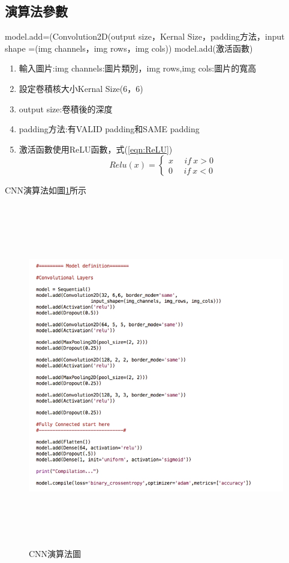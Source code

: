 \subsection{演算法參數}
model.add=(Convolution2D(output size，Kernal Size，padding方法，input shape =(img channels，img rows，img cols))
model.add(激活函數)
\begin{enumerate}
	\item
	      輸入圖片:img channels:圖片類別，img rows,img cols:圖片的寬高
	\item
	      設定卷積核大小Kernal Size(6，6)
	\item
	      output size:卷積後的深度
	\item
	      padding方法:有VALID padding和SAME padding
	\item
	      激活函數使用ReLU函數，式(\ref{eqn:ReLU})
	      \begin{equation}
		      \label{eqn:ReLU}
		      Relu(x)=
		      \left\{\begin{matrix}
			      x \ \ \ \ \ \ if\ x>0
			      \\
			      0 \ \ \ \ \ \ if\ x<0
		      \end{matrix}\right.
	      \end{equation}
\end{enumerate}
CNN演算法如圖\ref{fig:Keras}所示
\begin{figure}[H]
	\centerline{\includegraphics[height=15cm]{pic/Keras.jpg}}
	\caption{CNN演算法圖}
	\label{fig:Keras}
\end{figure}

